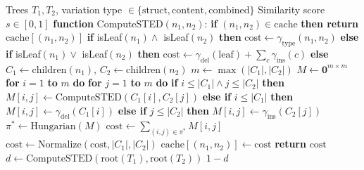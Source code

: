 \documentclass{article}
\begin{document}
\begin{algorithm}[h]
\caption{STED Similarity Computation}
\label{alg:sted}
\begin{algorithmic}[1]
\REQUIRE Trees $T_1, T_2$, variation type $\in \{\text{struct}, \text{content}, \text{combined}\}$
\ENSURE Similarity score $s \in [0, 1]$
\STATE
\STATE \textbf{function} ComputeSTED$(n_1, n_2)$:
\STATE \hspace{1em} \textbf{if} $(n_1, n_2) \in \text{cache}$ \textbf{then return} $\text{cache}[(n_1, n_2)]$
\STATE
\STATE \hspace{1em} \textbf{if} isLeaf$(n_1) \land$ isLeaf$(n_2)$ \textbf{then}
\STATE \hspace{2em} $\text{cost} \gets \gamma_{\text{type}}(n_1, n_2)$ 
\STATE \hspace{1em} \textbf{else if} isLeaf$(n_1) \lor$ isLeaf$(n_2)$ \textbf{then}
\STATE \hspace{2em} $\text{cost} \gets \gamma_{\text{del}}(\text{leaf}) + \sum_{c} \gamma_{\text{ins}}(c)$
\STATE \hspace{1em} \textbf{else}
\STATE \hspace{2em} $C_1 \gets \text{children}(n_1)$, $C_2 \gets \text{children}(n_2)$
\STATE \hspace{2em} $m \gets \max(|C_1|, |C_2|)$
\STATE \hspace{2em} $M \gets \mathbf{0}^{m \times m}$ 
\STATE \hspace{2em} \textbf{for} $i = 1$ \textbf{to} $m$ \textbf{do}
\STATE \hspace{3em} \textbf{for} $j = 1$ \textbf{to} $m$ \textbf{do}
\STATE \hspace{4em} \textbf{if} $i \leq |C_1| \land j \leq |C_2|$ \textbf{then}
\STATE \hspace{5em} $M[i,j] \gets \text{ComputeSTED}(C_1[i], C_2[j])$
\STATE \hspace{4em} \textbf{else if} $i \leq |C_1|$ \textbf{then}
\STATE \hspace{5em} $M[i,j] \gets \gamma_{\text{del}}(C_1[i])$
\STATE \hspace{4em} \textbf{else if} $j \leq |C_2|$ \textbf{then}
\STATE \hspace{5em} $M[i,j] \gets \gamma_{\text{ins}}(C_2[j])$
\STATE \hspace{2em} $\pi^* \gets \text{Hungarian}(M)$ 
\STATE \hspace{2em} $\text{cost} \gets \sum_{(i,j) \in \pi^*} M[i,j]$
\STATE \hspace{2em} $\text{cost} \gets \text{Normalize}(\text{cost}, |C_1|, |C_2|)$
\STATE \hspace{1em} $\text{cache}[(n_1, n_2)] \gets \text{cost}$
\STATE \hspace{1em} \textbf{return} $\text{cost}$
\STATE
\STATE $d \gets \text{ComputeSTED}(\text{root}(T_1), \text{root}(T_2))$
\RETURN $1 - d$
\end{algorithmic}
\end{algorithm}
\end{document}
